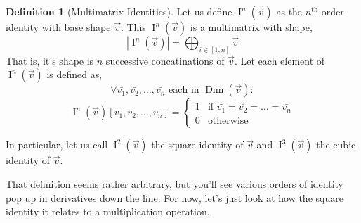 \documentclass[12pt]{article}
\theoremstyle{definition}
\newtheorem{definition}{Definition}[section]
\theoremstyle{plain}
\theoremstyle{ppart}
\DeclareMathOperator{\Dim}{Dim}
\DeclareMathOperator{\Ident}{I}
\begin{document}
\begin{definition}[Multimatrix Identities]
\label{mm_mult_ident}
Let us define $\Ident^n(\vec{v})$ as the $n^{\text{th}}$ order identity with base shape
$\vec{v}$. This $\Ident^n(\vec{v})$ is a multimatrix with shape,
\[ |\Ident^n(\vec{v})| = \bigoplus_{i \in [1, n]} \vec{v} \]
That is, it's shape is $n$ successive concatinations of $\vec{v}$.
Let each element of $\Ident^n(\vec{v})$ is defined as,
\[ \forall \bar{v_1}, \bar{v_2}, \ldots, \bar{v_n} \text{ each in } \Dim(\vec{v}) : \]
\[
 \Ident^n(\vec{v})[\bar{v_1}, \bar{v_2}, \ldots, \bar{v_n}]
 = \left\{
  \begin{array}{ll}
    1 & \mbox{if } \bar{v_1} = \bar{v_2} = \ldots = \bar{v_n} \\
    0 & \mbox{otherwise}
  \end{array}
 \right.
\]

In particular, let us call $\Ident^2(\vec{v})$ the square identity of $\vec{v}$ and
$\Ident^3(\vec{v})$ the cubic identity of $\vec{v}$.
\end{definition}

That definition seems rather arbitrary, but you'll see various orders of identity
pop up in derivatives down the line. For now, let's just look at how the
square identity it relates to a multiplication operation.
\end{document}
